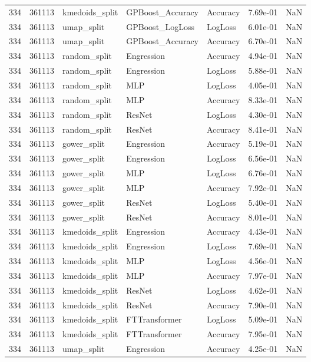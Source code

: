 \begin{tabular}{rrlllrr}
334 & 361113 & kmedoids\_split & GPBoost\_Accuracy & Accuracy & 7.69e-01 & NaN \\
334 & 361113 & umap\_split & GPBoost\_LogLoss & LogLoss & 6.01e-01 & NaN \\
334 & 361113 & umap\_split & GPBoost\_Accuracy & Accuracy & 6.70e-01 & NaN \\
334 & 361113 & random\_split & Engression & Accuracy & 4.94e-01 & NaN \\
334 & 361113 & random\_split & Engression & LogLoss & 5.88e-01 & NaN \\
334 & 361113 & random\_split & MLP & LogLoss & 4.05e-01 & NaN \\
334 & 361113 & random\_split & MLP & Accuracy & 8.33e-01 & NaN \\
334 & 361113 & random\_split & ResNet & LogLoss & 4.30e-01 & NaN \\
334 & 361113 & random\_split & ResNet & Accuracy & 8.41e-01 & NaN \\
334 & 361113 & gower\_split & Engression & Accuracy & 5.19e-01 & NaN \\
334 & 361113 & gower\_split & Engression & LogLoss & 6.56e-01 & NaN \\
334 & 361113 & gower\_split & MLP & LogLoss & 6.76e-01 & NaN \\
334 & 361113 & gower\_split & MLP & Accuracy & 7.92e-01 & NaN \\
334 & 361113 & gower\_split & ResNet & LogLoss & 5.40e-01 & NaN \\
334 & 361113 & gower\_split & ResNet & Accuracy & 8.01e-01 & NaN \\
334 & 361113 & kmedoids\_split & Engression & Accuracy & 4.43e-01 & NaN \\
334 & 361113 & kmedoids\_split & Engression & LogLoss & 7.69e-01 & NaN \\
334 & 361113 & kmedoids\_split & MLP & LogLoss & 4.56e-01 & NaN \\
334 & 361113 & kmedoids\_split & MLP & Accuracy & 7.97e-01 & NaN \\
334 & 361113 & kmedoids\_split & ResNet & LogLoss & 4.62e-01 & NaN \\
334 & 361113 & kmedoids\_split & ResNet & Accuracy & 7.90e-01 & NaN \\
334 & 361113 & kmedoids\_split & FTTransformer & LogLoss & 5.09e-01 & NaN \\
334 & 361113 & kmedoids\_split & FTTransformer & Accuracy & 7.95e-01 & NaN \\
334 & 361113 & umap\_split & Engression & Accuracy & 4.25e-01 & NaN \\

\end{tabular}

